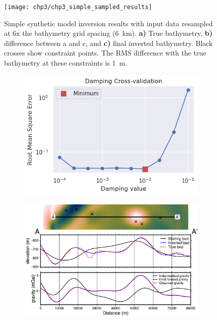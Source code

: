 \begin{figure}[!ht]
    \centering
    \texttt{[image: chp3/chp3\_simple\_sampled\_results]}
    \caption[Synthetic inversion with sampled gravity]{Simple synthetic model inversion results with input data resampled at 6x the bathymetry grid spacing (6~km). \textbf{a)} True bathymetry, \textbf{b)} difference between a and c, and \textbf{c)} final inverted bathymetry. Black crosses show constraint points. The RMS difference with the true bathymetry at these constraints is 1~m.}
    \label{fig:chp3_simple_sampled_results}
\end{figure}

\begin{figure}[!ht]
  \centering
    \begin{subfigure}[t]{.40\textwidth}
        \centering
        \includegraphics[width=\textwidth]{figures/chp3/chp3_simple_sampled_CV.png}
        \caption{}
    \end{subfigure}
    \begin{subfigure}[t]{.58\textwidth}
        \centering
        \includegraphics[width=\textwidth]{figures/chp3/chp3_simple_sampled_profile.png}

\end{subfigure}
\end{figure}
